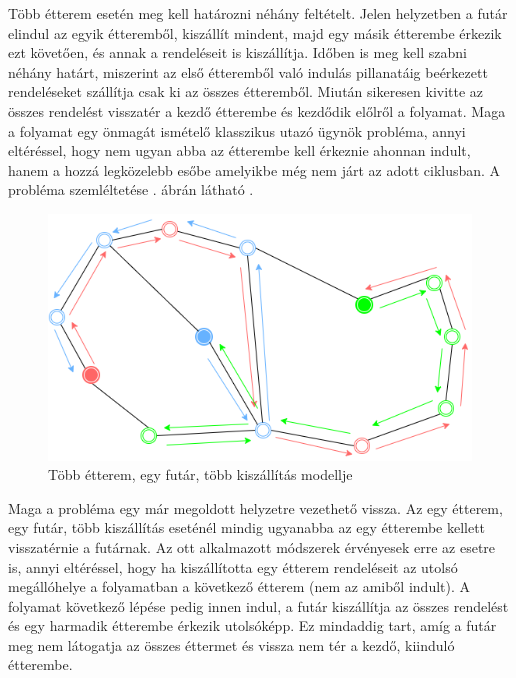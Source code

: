 

Több étterem esetén meg kell határozni néhány feltételt. Jelen helyzetben a futár elindul az egyik étteremből, kiszállít mindent, majd egy másik étterembe érkezik ezt követően, és annak a rendeléseit is kiszállítja. Időben is meg kell szabni néhány határt, miszerint az első étteremből való indulás pillanatáig beérkezett rendeléseket szállítja csak ki az összes étteremből. Miután sikeresen kivitte az összes rendelést visszatér a kezdő étterembe és kezdődik előlről a folyamat. Maga a folyamat egy önmagát ismételő klasszikus utazó ügynök probléma, annyi eltéréssel, hogy nem ugyan abba az étterembe kell érkeznie ahonnan indult, hanem a hozzá legközelebb esőbe amelyikbe még nem járt az adott ciklusban. A probléma szemléltetése . ábrán látható \cite{Diagrams.net}.

\begin{figure}[h!]
\centering
\includegraphics[scale=0.6]{images/Circulartsp.png}
\caption{Több étterem, egy futár, több kiszállítás modellje}
\label{fig:model3}
\end{figure}



Maga a probléma egy már megoldott helyzetre vezethető vissza. Az egy étterem, egy futár, több kiszállítás eseténél mindig ugyanabba az egy étterembe kellett visszatérnie a futárnak. Az ott alkalmazott módszerek érvényesek erre az esetre is, annyi eltéréssel, hogy ha kiszállította egy étterem rendeléseit az utolsó megállóhelye a folyamatban a következő étterem (nem az amiből indult). A folyamat következő lépése pedig innen indul, a futár kiszállítja az összes rendelést és egy harmadik étterembe érkezik utolsóképp. Ez mindaddig tart, amíg a futár meg nem látogatja az összes éttermet és vissza nem tér a kezdő, kiinduló étterembe. 

